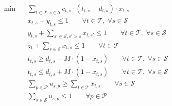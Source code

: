 \begin{align}
  \min\quad & \sum_{t \in \mathcal{T}, s \in \mathcal{S}} c_{t,s} \cdot (t_{t,s} - d_{t,s}) \cdot x_{t,s} \tag{passenger\_delays} \\
  & x_{t,s} + y_{t,s} \le 1 \qquad \forall t \in \mathcal{T},\; \forall s \in \mathcal{S} \tag{stopping} \\
  & y_{t,s} + \sum_{s' \in \mathcal{S}, s' > s} x_{t,s'} \le 1 \qquad \forall t \in \mathcal{T},\; \forall s \in \mathcal{S} \tag{short\_turning} \\
  & z_{t} + \sum_{s \in \mathcal{S}} x_{t,s} \le 1 \qquad \forall t \in \mathcal{T} \tag{cancelling} \\
  & t_{t,s} \ge d_{t,s} - M \cdot (1 - x_{t,s}) \qquad \forall t \in \mathcal{T},\; \forall s \in \mathcal{S} \tag{retiming} \\
  & t_{t,s} \le d_{t,s} + M \cdot (1 - x_{t,s}) \qquad \forall t \in \mathcal{T},\; \forall s \in \mathcal{S} \tag{retiming} \\
  & \sum_{p \in \mathcal{P}} u_{s,p} \ge \sum_{t \in \mathcal{T}} x_{t,s} \qquad \forall s \in \mathcal{S} \tag{platform} \\
  & \sum_{s \in \mathcal{S}} u_{s,p} \le 1 \qquad \forall p \in \mathcal{P} \tag{platform} \\
\end{align}